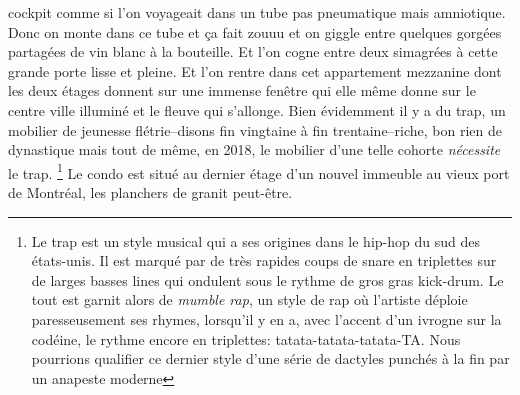 cockpit comme si l'on voyageait dans un tube pas pneumatique mais amniotique.
Donc on monte dans ce tube et ça fait zouuu et on giggle entre quelques gorgées
partagées de vin blanc à la bouteille. Et l'on cogne entre deux simagrées
à cette grande porte lisse et pleine. Et l'on rentre dans cet appartement
mezzanine dont les deux étages donnent sur une immense fenêtre qui elle
même donne sur le centre ville illuminé et le fleuve qui s'allonge. 
Bien évidemment il y a du trap, un mobilier de jeunesse flétrie--disons
fin vingtaine à fin trentaine--riche, bon rien de dynastique mais tout de même,
en 2018, le mobilier d'une telle cohorte \emph{nécessite} le trap.
%
\footnote{Le trap est un style musical qui a ses origines dans le hip-hop du sud
	des états-unis. Il est marqué par de très rapides coups de snare en
	triplettes sur de larges basses lines qui ondulent sous le rythme de
	gros gras kick-drum. Le tout est garnit alors de \textit{mumble rap}, un
	style de rap où l'artiste déploie paresseusement ses rhymes, lorsqu'il y
	en a, avec l'accent d'un ivrogne sur la codéine, le rythme encore en
	triplettes: tatata-tatata-tatata-TA. Nous pourrions qualifier ce dernier
style d'une série de dactyles punchés à la fin par un anapeste moderne} Le condo
est situé au dernier étage d'un nouvel immeuble au vieux port de Montréal, les
planchers de granit peut-être.

